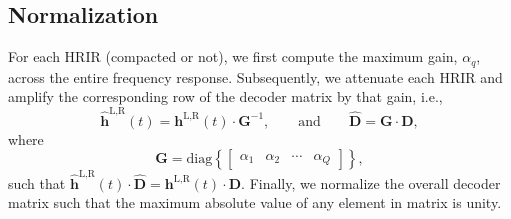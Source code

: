 \subsection{Normalization}
For each HRIR (compacted or not), we first compute the maximum gain, $\alpha_q$, across the entire frequency response.
Subsequently, we attenuate each HRIR and amplify the corresponding row of the decoder matrix by that gain, i.e.,
\begin{equation}
\mathbf{\hat{h}}^{\text{L,R}}(t) = \mathbf{h}^{\text{L,R}}(t) \cdot \mathbf{G}^{-1},
\quad\quad
\text{and}
\quad\quad
\mathbf{\hat{D}} = \mathbf{G} \cdot \mathbf{D},
\end{equation}
where
\begin{equation}
\mathbf{G} = \text{diag} \left\{ \begin{bmatrix} \alpha_1 & \alpha_2 & \cdots & \alpha_Q \end{bmatrix} \right\},
\end{equation}
such that $\mathbf{\hat{h}}^{\text{L,R}}(t) \cdot \mathbf{\hat{D}} = \mathbf{h}^{\text{L,R}}(t) \cdot \mathbf{D}$.
Finally, we normalize the overall decoder matrix such that the maximum absolute value of any element in matrix is unity.